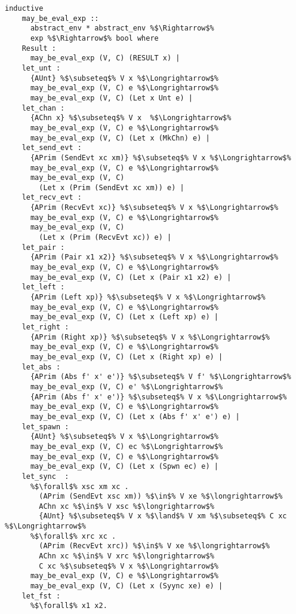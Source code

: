 \documentclass{article}
\begin{document}
\begin{lstlisting}[style=codestyle1, escapechar=\%]
  inductive
    may_be_eval_exp ::
      abstract_env * abstract_env %$\Rightarrow$%
      exp %$\Rightarrow$% bool where
    Result :
      may_be_eval_exp (V, C) (RESULT x) |
    let_unt :
      {AUnt} %$\subseteq$% V x %$\Longrightarrow$%
      may_be_eval_exp (V, C) e %$\Longrightarrow$% 
      may_be_eval_exp (V, C) (Let x Unt e) |
    let_chan : 
      {AChn x} %$\subseteq$% V x  %$\Longrightarrow$%
      may_be_eval_exp (V, C) e %$\Longrightarrow$%
      may_be_eval_exp (V, C) (Let x (MkChn) e) |
    let_send_evt : 
      {APrim (SendEvt xc xm)} %$\subseteq$% V x %$\Longrightarrow$%
      may_be_eval_exp (V, C) e %$\Longrightarrow$% 
      may_be_eval_exp (V, C)
        (Let x (Prim (SendEvt xc xm)) e) |
    let_recv_evt :
      {APrim (RecvEvt xc)} %$\subseteq$% V x %$\Longrightarrow$%
      may_be_eval_exp (V, C) e %$\Longrightarrow$% 
      may_be_eval_exp (V, C)
        (Let x (Prim (RecvEvt xc)) e) |
    let_pair : 
      {APrim (Pair x1 x2)} %$\subseteq$% V x %$\Longrightarrow$%
      may_be_eval_exp (V, C) e %$\Longrightarrow$% 
      may_be_eval_exp (V, C) (Let x (Pair x1 x2) e) |
    let_left : 
      {APrim (Left xp)} %$\subseteq$% V x %$\Longrightarrow$%
      may_be_eval_exp (V, C) e %$\Longrightarrow$% 
      may_be_eval_exp (V, C) (Let x (Left xp) e) |
    let_right :
      {APrim (Right xp)} %$\subseteq$% V x %$\Longrightarrow$%
      may_be_eval_exp (V, C) e %$\Longrightarrow$% 
      may_be_eval_exp (V, C) (Let x (Right xp) e) |
    let_abs : 
      {APrim (Abs f' x' e')} %$\subseteq$% V f' %$\Longrightarrow$%
      may_be_eval_exp (V, C) e' %$\Longrightarrow$%
      {APrim (Abs f' x' e')} %$\subseteq$% V x %$\Longrightarrow$%
      may_be_eval_exp (V, C) e %$\Longrightarrow$% 
      may_be_eval_exp (V, C) (Let x (Abs f' x' e') e) |
    let_spawn :
      {AUnt} %$\subseteq$% V x %$\Longrightarrow$%
      may_be_eval_exp (V, C) ec %$\Longrightarrow$% 
      may_be_eval_exp (V, C) e %$\Longrightarrow$%  
      may_be_eval_exp (V, C) (Let x (Spwn ec) e) |
    let_sync  : 
      %$\forall$% xsc xm xc . 
        (APrim (SendEvt xsc xm)) %$\in$% V xe %$\longrightarrow$% 
        AChn xc %$\in$% V xsc %$\longrightarrow$%
        {AUnt} %$\subseteq$% V x %$\land$% V xm %$\subseteq$% C xc %$\Longrightarrow$%
      %$\forall$% xrc xc . 
        (APrim (RecvEvt xrc)) %$\in$% V xe %$\longrightarrow$%
        AChn xc %$\in$% V xrc %$\longrightarrow$%
        C xc %$\subseteq$% V x %$\Longrightarrow$%
      may_be_eval_exp (V, C) e %$\Longrightarrow$%  
      may_be_eval_exp (V, C) (Let x (Syync xe) e) |
    let_fst : 
      %$\forall$% x1 x2.

\end{lstlisting}
\end{document}
